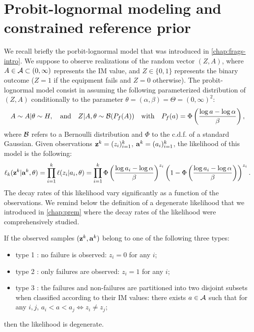 \section{Probit-lognormal modeling and constrained reference prior}

We recall briefly the porbit-lognormal model that was introduced in \cref{chap:frags-intro}. We suppose to observe realizations of the random vector $(Z,A)$, where $A\in\mathcal{A}\subset(0,\infty)$ represents the IM value, and $Z\in\{0,1\}$ represents the binary outcome ($Z=1$ if the equipment fails and $Z=0$ otherwise).
The probit-lognormal model consist in assuming the following parameterized distribution of $(Z,A)$ conditionally to the parameter $\theta=(\alpha,\beta)=\Theta=(0,\infty)^2$:
    \begin{equation}
        A\sim A|\theta\sim H,\quad\text{and}\quad Z|A,\theta\sim\mathcal{B}(P_f(A))\quad\text{with}\quad P_f(a)=\Phi\left(\frac{\log a-\log\alpha}{\beta}\right),
    \end{equation}
where $\mathcal{B}$ refers to a Bernoulli distribution and $\Phi$ to the c.d.f. of a standard Gaussian.
Given observations $\mathbf{z}^k=(z_i)_{i=1}^k$, $\mathbf{a}^k=(a_i)_{i=1}^k$, the likelihood of this model is the following:
    \begin{equation}
        \ell_k(\mathbf{z}^k|\mathbf{a}^k,\theta) = \prod_{i=1}^{k}\ell(z_i|a_i,\theta) = \prod_{i=1}^k\Phi\left(\frac{\log a_i-\log\alpha}{\beta}\right)^{z_i}\left(1-\Phi\left(\frac{\log a_i-\log\alpha}{\beta}\right)\right)^{z_i}.
    \end{equation}
The decay rates of this likelihood vary significantly as a function of the observations. We remind below the definition of a degenerate likelihood that we introduced in \cref{chap:prem} where the decay rates of the likelihood were comprehensively studied.

\begin{defi}\label{def:doe:degeneracy}
    If the observed samples $(\mathbf{z}^k,\mathbf{a}^k)$ belong to one of the following three types:
    \begin{itemize}
        \item
        type 1 : no failure is observed: $z_i=0$ for any $i$;
        \item type 2 : only failures are observed: $z_i=1$ for any $i$;
        \item type 3 : the failures and non-failures are partitioned into two disjoint subsets when classified according to their IM values:
        there exists $a\in\mathcal{A}$ such that for any $i,j$, $a_i<a<a_j\Longleftrightarrow z_i\ne z_j$; %
    \end{itemize}
    then the likelihood is degenerate.
\end{defi}




